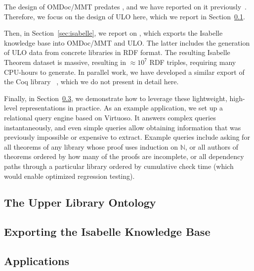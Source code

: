 The design of OMDoc/MMT predates \pn, and we have reported on it previously~\cite{Kohlhase:OMDoc1.2,RabKoh:WSMSML13,DehKohKon:iop16,KohMuePfe:kbimss17}.
Therefore, we focus on the design of ULO here, which we report in Section~\ref{sec:ulo}.

Then, in Section~\ref{sec:isabelle}, we report on , which exports the Isabelle knowledge base into OMDoc/MMT and ULO.  The latter includes the generation of ULO data from concrete libraries in RDF format.  The resulting Isabelle Theorem dataset is massive, resulting in  $\approx 10^7$ RDF triples, requiring many CPU-hours to generate.  In parallel work, we have developed a similar export of the Coq library ~\cite{MueRabSac:cltg19}, which we do not present in detail here.

Finally, in Section~\ref{sec:uloappl}, we demonstrate how to leverage these lightweight, high-level representations in practice.
As an example application, we set up a relational query engine based on Virtuoso.
It answers complex queries instantaneously, and even simple queries allow obtaining information that was previously impossible or expensive to extract.
Example queries include asking for all theorems of any library whose proof uses induction on $\mathbb{N}$,
or all authors of theorems ordered by how many of the proofs are incomplete,
or all dependency paths through a particular library ordered by cumulative check time (which would enable optimized regression testing).

\subsection{The Upper Library Ontology}\label{sec:ulo}


\subsection{Exporting the Isabelle Knowledge Base}\label{sec:isabelle-export}


\subsection{Applications}\label{sec:uloappl}



